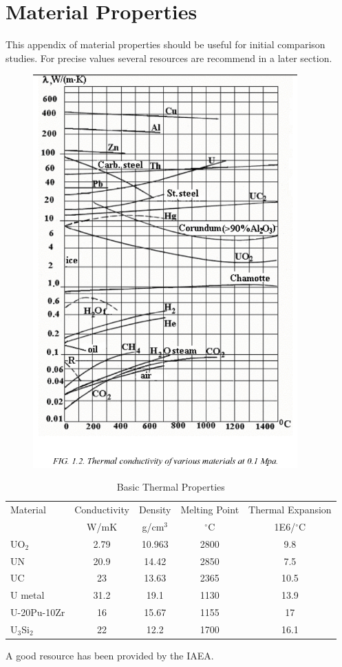 \chapter*{Material Properties}
This appendix of material properties should be useful for initial comparison studies. For precise values several resources are recommend in a later section.


\begin{figure}[htbp]
  \centering
  \includegraphics[width=4in]{graphics/thermal-k.png}  
\end{figure}



\begin{table}
  \centering
  \caption{Basic Thermal Properties\cite{IAEA_1}}
  \begin{tabular}{lcccc}
    \toprule  
    Material & Conductivity & Density & Melting Point & Thermal Expansion\\ 
             & W/mK &    g/cm$^3$     &   $^{\circ}$C  &  1E6/$^{\circ}$C \\
    \midrule    
    UO$_2$ & 2.79 & 10.963 & 2800 & 9.8\\
    UN     & 20.9 & 14.42  & 2850 & 7.5\\
    UC     & 23   & 13.63  & 2365 & 10.5\\
    U metal & 31.2 & 19.1  & 1130 & 13.9\\
    U-20Pu-10Zr & 16 & 15.67 & 1155 &17\\
    U$_3$Si$_2$ & 22 & 12.2  & 1700 &16.1 \\
    \bottomrule
  \end{tabular}

\end{table}


A good resource has been provided by the IAEA\cite{IAEA_1}.


\begingroup
\let\cleardoublepage\clearpage





\endgroup
